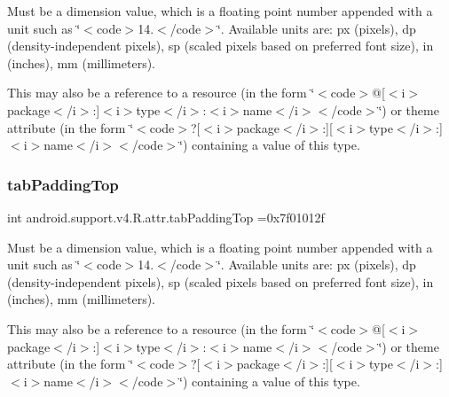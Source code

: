 Must be a dimension value, which is a floating point number appended with a unit such as \char`\"{}$<$code$>$14.\+5sp$<$/code$>$\char`\"{}. Available units are\+: px (pixels), dp (density-\/independent pixels), sp (scaled pixels based on preferred font size), in (inches), mm (millimeters). 

This may also be a reference to a resource (in the form \char`\"{}$<$code$>$@\mbox{[}$<$i$>$package$<$/i$>$\+:\mbox{]}$<$i$>$type$<$/i$>$\+:$<$i$>$name$<$/i$>$$<$/code$>$\char`\"{}) or theme attribute (in the form \char`\"{}$<$code$>$?\mbox{[}$<$i$>$package$<$/i$>$\+:\mbox{]}\mbox{[}$<$i$>$type$<$/i$>$\+:\mbox{]}$<$i$>$name$<$/i$>$$<$/code$>$\char`\"{}) containing a value of this type. \mbox{\label{classandroid_1_1support_1_1v4_1_1R_1_1attr_a52d18671529e90af8baacabe3fb145f5}} 
\subsubsection{\texorpdfstring{tab\+Padding\+Top}{tabPaddingTop}}
{\footnotesize\ttfamily int android.\+support.\+v4.\+R.\+attr.\+tab\+Padding\+Top =0x7f01012f\hspace{0.3cm}{\ttfamily [static]}}

Must be a dimension value, which is a floating point number appended with a unit such as \char`\"{}$<$code$>$14.\+5sp$<$/code$>$\char`\"{}. Available units are\+: px (pixels), dp (density-\/independent pixels), sp (scaled pixels based on preferred font size), in (inches), mm (millimeters). 

This may also be a reference to a resource (in the form \char`\"{}$<$code$>$@\mbox{[}$<$i$>$package$<$/i$>$\+:\mbox{]}$<$i$>$type$<$/i$>$\+:$<$i$>$name$<$/i$>$$<$/code$>$\char`\"{}) or theme attribute (in the form \char`\"{}$<$code$>$?\mbox{[}$<$i$>$package$<$/i$>$\+:\mbox{]}\mbox{[}$<$i$>$type$<$/i$>$\+:\mbox{]}$<$i$>$name$<$/i$>$$<$/code$>$\char`\"{}) containing a value of this type. \mbox{\label{classandroid_1_1support_1_1v4_1_1R_1_1attr_a785cc6ac834de1b16151d47714ba0b08}} 
